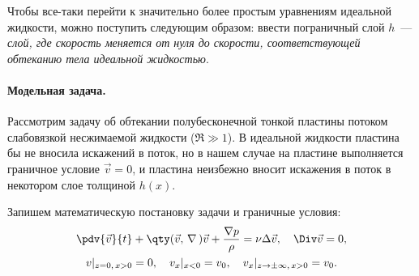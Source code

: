 Чтобы все-таки перейти к значительно более простым уравнениям идеальной жидкости, можно поступить следующим образом: ввести пограничный слой $h$~--- \textit{слой, где скорость меняется от нуля до скорости, соответствующей обтеканию тела идеальной жидкостью}\footnotemark.

\paragraph{Модельная задача.} Рассмотрим задачу об обтекании полубесконечной тонкой пластины потоком слабовязкой несжимаемой жидкости ($\Re \gg 1$). В идеальной жидкости пластина бы не вносила искажений в поток, но в нашем случае на пластине выполняется граничное условие $\vec{v}=0$, и    пластина неизбежно вносит искажения в поток в некотором слое толщиной $h(x)$.

Запишем математическую постановку задачи и граничные условия:
\begin{gather}
	\pdv{\vec{v}}{t}+\qty(\vec{v},\,\nabla\,)\vec{v}+\frac{\nabla p}{\rho}=\nu \Delta \vec{v}, \quad \Div \vec{v}=0,\\
	v |_{z=0,\,x>0}=0, \quad
	v_x |_{x<0}=v_0, \quad
	v_x |_{z\to \pm\infty,\,x>0}=v_0.
\end{gather}

